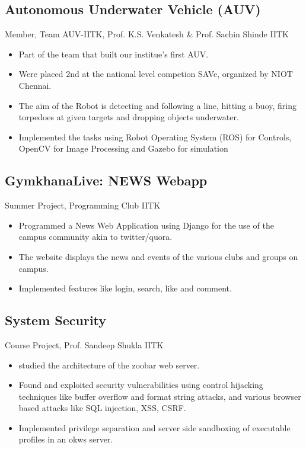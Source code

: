 \documentclass{article}
\begin{document}
    \subsection*{Autonomous Underwater Vehicle (AUV)}
    {Member, Team AUV-IITK, Prof. K.S. Venkatesh \& Prof. Sachin Shinde \hfill IITK}
    \begin{itemize}
        \itemsep0em
        \item {Part of the team that built our institue's first AUV. \cite{AUV} }
        \item {Were placed 2nd at the national level competion SAVe, organized by NIOT Chennai.}
        \item {The aim of the Robot is detecting and following a line, hitting a buoy, firing torpedoes at given targets and dropping objects underwater.}
        \item {Implemented the tasks using Robot Operating System (ROS) for Controls, OpenCV for Image Processing and Gazebo for simulation} 
    \end{itemize}
    
    \subsection*{GymkhanaLive: NEWS Webapp}
    {Summer Project, Programming Club \hfill IITK}
    \begin{itemize}
        \itemsep0em
        \item Programmed a News Web Application using Django \cite{google} for the use of the campus community akin to twitter/quora.
    	\item The website displays the news and events of the various clubs and groups on campus.
    	\item Implemented features like login, search, like and comment.
    \end{itemize}    
 
    \subsection*{System Security}
    {Course Project, Prof. Sandeep Shukla \hfill IITK}
    \begin{itemize} 
        \itemsep0em
        \item studied the architecture of the zoobar web server.
        \item Found and exploited security vulnerabilities using control hijacking techniques like buffer overflow and format string attacks, and various browser based attacks like SQL injection, XSS, CSRF. 
        \item Implemented privilege separation and server side sandboxing of executable profiles in an okws server.
    \end{itemize}
\end{document}
